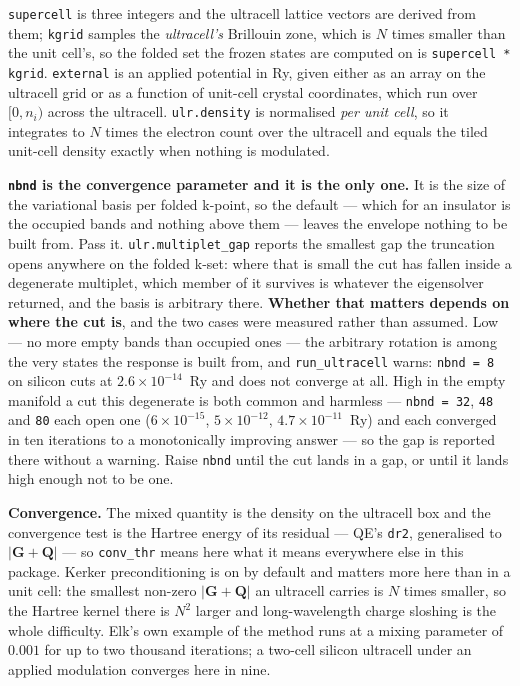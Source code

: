 \documentclass[11pt,a4paper]{article}
\newcommand{\code}[1]{\texttt{\small #1}}
\begin{document}
\code{supercell} is three integers and the ultracell lattice vectors are derived
from them; \code{kgrid} samples the \emph{ultracell's} Brillouin zone, which is
$N$ times smaller than the unit cell's, so the folded set the frozen states are
computed on is \code{supercell * kgrid}. \code{external} is an applied potential
in Ry, given either as an array on the ultracell grid or as a function of
unit-cell crystal coordinates, which run over $[0, n_i)$ across the ultracell.
\code{ulr.density} is normalised \emph{per unit cell}, so it integrates to $N$
times the electron count over the ultracell and equals the tiled unit-cell
density exactly when nothing is modulated.

\textbf{\code{nbnd} is the convergence parameter and it is the only one.} It is
the size of the variational basis per folded k-point, so the default --- which
for an insulator is the occupied bands and nothing above them --- leaves the
envelope nothing to be built from. Pass it. \code{ulr.multiplet\_gap} reports
the smallest gap the truncation opens anywhere on the folded k-set: where that
is small the cut has fallen inside a degenerate multiplet, which member of it
survives is whatever the eigensolver returned, and the basis is arbitrary
there. \textbf{Whether that matters depends on where the cut is}, and the two
cases were measured rather than assumed. Low --- no more empty bands than
occupied ones --- the arbitrary rotation is among the very states the response
is built from, and \code{run\_ultracell} warns: \code{nbnd = 8} on silicon cuts
at $2.6\times10^{-14}$~Ry and does not converge at all. High in the empty
manifold a cut this degenerate is both common and harmless --- \code{nbnd = 32},
\code{48} and \code{80} each open one ($6\times10^{-15}$, $5\times10^{-12}$,
$4.7\times10^{-11}$~Ry) and
each converged in ten iterations to a monotonically improving answer --- so the
gap is reported there without a warning. Raise \code{nbnd} until the cut lands
in a gap, or until it lands high enough not to be one.

\textbf{Convergence.} The mixed quantity is the density on the ultracell box and
the convergence test is the Hartree energy of its residual --- QE's \code{dr2},
generalised to $|\mathbf G + \mathbf Q|$ --- so \code{conv\_thr} means here what
it means everywhere else in this package. Kerker preconditioning is on by
default and matters more here than in a unit cell: the smallest non-zero
$|\mathbf G+\mathbf Q|$ an ultracell carries is $N$ times smaller, so the
Hartree kernel there is $N^2$ larger and long-wavelength charge sloshing is the
whole difficulty. Elk's own example of the method runs at a mixing parameter of
$0.001$ for up to two thousand iterations; a two-cell silicon ultracell under an
applied modulation converges here in nine.
\end{document}
